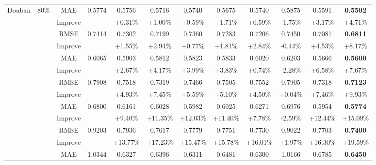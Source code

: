 \begin{table}[t]
{\begin{tabular}{|c|c|c||c|c|c|c|c|c||c|c||c|}
\hline
\hline
\multirow{16}{*}{Douban}& \multirow{4}{*}{80\%} & {MAE} & {0.5774} & {0.5756}  & {0.5716} & {0.5740}   & {0.5675}   &  {0.5740}    & {0.5875}   & {0.5591} &{\textbf{0.5502}} \\
\multirow{16}{*}{} &\multirow{4}{*}{}& {Improve} & {} & {+0.31\%} & {+1.00\%} & {+0.59\%} & {+1.71\%}  & {+0.59\%} & {-1.75\%} &{+3.17\%} & {+4.71\%} \\
\cline{3-12}
\multirow{16}{*}{Book} &\multirow{4}{*}{}& {RMSE}             & {0.7414} & {0.7302}   & {0.7199} & {0.7360}   & {0.7283}   &  {0.7206}    & {0.7450}  & {0.7081} &{\textbf{0.6811}}\\
\multirow{16}{*}{} &\multirow{4}{*}{}& {Improve} & {} & {+1.55\%} & {+2.94\%} & {+0.77\%} & {+1.81\%}  & {+2.84\%} & {-0.44\%} &{+4.53\%} & {+8.17\%} \\
\cline{2-12}
\multirow{16}{*}{} &\multirow{4}{*}{}\multirow{4}{*}{60\%} & {MAE} & {0.6065} & {0.5903}   &{0.5812} & {0.5823}   & {0.5833}   &  {0.6020}   & {0.6203}  & {0.5666} &{\textbf{0.5600}}\\
\multirow{16}{*}{} &\multirow{4}{*}{}& {Improve} & {} & {+2.67\%} & {+4.17\%} & {+3.99\%} & {+3.83\%}  & {+0.74\%} & {-2.28\%} &{+6.58\%} & {+7.67\%} \\
\cline{3-12}
\multirow{16}{*}{} &\multirow{4}{*}{}& {RMSE}    & {0.7908} & {0.7518}   &{0.7319} & {0.7466}   & {0.7505}   &  {0.7552}   & {0.7905}  & {0.7318} &{\textbf{0.7123}}\\
\multirow{16}{*}{} &\multirow{4}{*}{}& {Improve} & {} & {+4.93\%} & {+7.45\%} & {+5.59\%} & {+5.10\%}  & {+4.50\%} & {+0.04\%} &{+7.46\%} & {+9.93\%} \\
\cline{2-12}
\multirow{16}{*}{} &\multirow{4}{*}{}\multirow{4}{*}{40\%} & {MAE} & {0.6800} & {0.6161}   &{0.6028} & {0.5982}   & {0.6025}   &  {0.6271}   & {0.6976}  & {0.5954} &{\textbf{0.5774}}\\
\multirow{16}{*}{} &\multirow{4}{*}{}& {Improve} & {} & {+9.40\%} & {+11.35\%} & {+12.03\%} & {+11.40\%}  & {+7.78\%} & {-2.59\%} &{+12.44\%}& {+15.09\%} \\
\cline{3-12}
\multirow{16}{*}{} &\multirow{4}{*}{}& {RMSE}    & {0.9203} & {0.7936}   &{0.7617} & {0.7779}   & {0.7751}   &  {0.7730}   & {0.9022}  & {0.7703} &{\textbf{0.7400}}\\
\multirow{16}{*}{} &\multirow{4}{*}{}& {Improve} & {} & {+13.77\%} & {+17.23\%} & {+15.47\%} & {+15.78\%}  & {+16.01\%} & {+1.97\%} &{+16.30\%} & {+19.59\%} \\
\cline{2-12}
\multirow{16}{*}{} &\multirow{4}{*}{}\multirow{4}{*}{20\%} & {MAE}& {1.0344} & {0.6327}   &{0.6396} & {0.6311}   & {0.6481}   &  {0.6300}   & {1.0166}   & {0.6785}  &{\textbf{0.6450}}\\

\end{tabular}}
\end{table}
